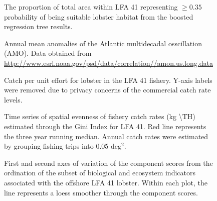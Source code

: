 \documentclass[11pt]{article}
\newcommand{\D}{.}
\newcommand{\e}{/SpinDr/backup/bio_data/bio.lobster/figures/} %
\begin{document}
\begin{figure}

    \caption{The proportion of total area within LFA 41 representing $\geq 0.35$ probability of being suitable lobster habitat from the boosted regression tree results. }

\end{figure}


\begin{figure}

    \caption{Annual mean anomalies of the Atlantic multidecadal osscillation (AMO). Data obtained from \url{http://www.esrl.noaa.gov/psd/data/correlation//amon.us.long.data}}

\end{figure}

\begin{figure}

    \caption{Catch per unit effort for lobster in the LFA 41 fishery. Y-axis labels were removed due to privacy concerns of the commercial catch rate levels.}

\end{figure}

\begin{figure}

    \caption{Time series of spatial evenness of fishery catch rates (kg \textbackslash TH) estimated through the Gini Index for LFA 41. Red line represents the three year running median. Annual catch rates were estimated by grouping fishing trips into 0.05 deg$^2$.}

\end{figure}

\clearpage

\begin{figure}

    
    \caption{First and second axes of variation of the component scores from the ordination of the subset of biological and ecosystem indicators associated with the offshore LFA 41 lobster. Within each plot, the line represents a loess smoother through the component scores.}

\end{figure}
\clearpage
\end{document}
